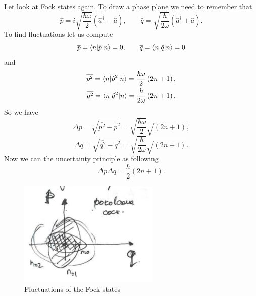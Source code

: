 Let look at Fock states again. To draw a phase plane we need to remember that
\begin{equation}
	\hat{p} = i \sqrt{\frac{\hbar \omega}{2}} \left( \hat{a}^{\dagger} - \hat{a} \right), \qquad \hat{q} = \sqrt{\frac{\hbar}{2 \omega}}\left( \hat{a}^{\dagger} + \hat{a} \right).
\end{equation}
To find fluctuations let us compute
\begin{equation}
	\overline{p} = \langle n\rvert \hat{p} \lvert n\rangle = 0, \qquad \overline{q} = \langle n\rvert \hat{q} \lvert n\rangle = 0
\end{equation}
and
\begin{eqnarray}
	\overline{p^2} = \langle n\rvert \hat{p}^2 \lvert n\rangle = \frac{\hbar \omega}{2} \left( 2n+1 \right), \\
	\overline{q^2} = \langle n\rvert \hat{q}^2 \lvert n\rangle = \frac{\hbar}{2 \omega} \left( 2n+1 \right).
\end{eqnarray}
So we have
\begin{equation}
	\Delta p = \sqrt{\overline{p^2} - \overline{p}^2} = \sqrt{\frac{\hbar \omega}{2}} \sqrt{\left( 2n+1 \right)}, 
\end{equation}
\begin{equation}
	\Delta q = \sqrt{\overline{q^2} - \overline{q}^2} = \sqrt{\frac{\hbar }{2\omega}} \sqrt{\left( 2n+1 \right)}.
\end{equation}
Now we can the uncertainty principle as following
\begin{equation}
	\Delta p \Delta q = \frac{\hbar}{2} \left(2n+1\right).
\end{equation}

\begin{figure}
	\centering
	\includegraphics[width=0.4\linewidth]{fig/L2/fluc}
	\caption{Fluctuations of the Fock states}
	\label{fig:fluc}
\end{figure}

